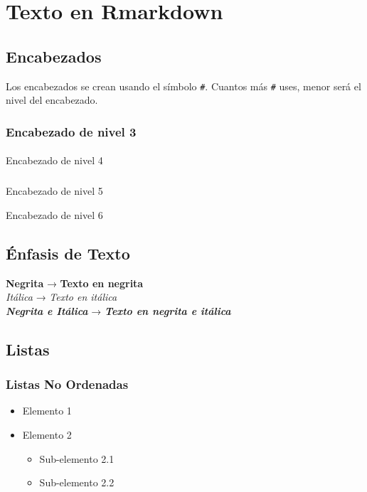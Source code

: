 \documentclass[
  10pt,
]{article}
\makeatletter
\let\oldparagraph\paragraph
\renewcommand{\paragraph}{
    \@ifstar
      \xxxParagraphStar
      \xxxParagraphNoStar
  }
\newcommand{\xxxParagraphStar}[1]{\oldparagraph*{#1}\mbox{}}
\newcommand{\xxxParagraphNoStar}[1]{\oldparagraph{#1}\mbox{}}
\let\oldsubparagraph\subparagraph
\renewcommand{\subparagraph}{
    \@ifstar
      \xxxSubParagraphStar
      \xxxSubParagraphNoStar
  }
\newcommand{\xxxSubParagraphStar}[1]{\oldsubparagraph*{#1}\mbox{}}
\newcommand{\xxxSubParagraphNoStar}[1]{\oldsubparagraph{#1}\mbox{}}
\providecommand{\tightlist}{%
  \setlength{\itemsep}{0pt}\setlength{\parskip}{0pt}}\usepackage{longtable,booktabs,array}
\makeatother
\begin{document}
\section{Texto en Rmarkdown}\label{texto-en-rmarkdown}

\subsection{Encabezados}\label{encabezados}

Los encabezados se crean usando el símbolo \texttt{\#}. Cuantos más
\texttt{\#} uses, menor será el nivel del encabezado.

\subsubsection{Encabezado de nivel 3}\label{encabezado-de-nivel-3}

\paragraph{Encabezado de nivel 4}\label{encabezado-de-nivel-4}

\subparagraph{Encabezado de nivel 5}\label{encabezado-de-nivel-5}

Encabezado de nivel 6

\subsection{Énfasis de Texto}\label{uxe9nfasis-de-texto}

\textbf{Negrita} → \textbf{Texto en negrita}\\
\emph{Itálica} → \emph{Texto en itálica}\\
\textbf{\emph{Negrita e Itálica}} → \textbf{\emph{Texto en negrita e
itálica}}

\subsection{Listas}\label{listas}

\subsubsection{Listas No Ordenadas}\label{listas-no-ordenadas}

\begin{itemize}
\tightlist
\item
  Elemento 1
\item
  Elemento 2

  \begin{itemize}
  \tightlist
  \item
    Sub-elemento 2.1
  \item
    Sub-elemento 2.2
  \end{itemize}
\end{itemize}
\end{document}
